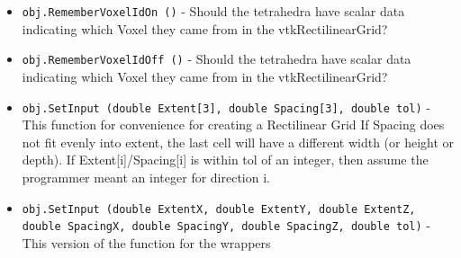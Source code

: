 \begin{itemize}
\item  \verb|obj.RememberVoxelIdOn ()| -  Should the tetrahedra have scalar data
 indicating which Voxel they came from in the vtkRectilinearGrid?

\item  \verb|obj.RememberVoxelIdOff ()| -  Should the tetrahedra have scalar data
 indicating which Voxel they came from in the vtkRectilinearGrid?

\item  \verb|obj.SetInput (double Extent[3], double Spacing[3], double tol)| -  This function for convenience for creating a Rectilinear Grid
 If Spacing does not fit evenly into extent, the last cell will
 have a different width (or height or depth).
 If Extent[i]/Spacing[i] is within tol of an integer, then
 assume the programmer meant an integer for direction i.

\item  \verb|obj.SetInput (double ExtentX, double ExtentY, double ExtentZ, double SpacingX, double SpacingY, double SpacingZ, double tol)| -  This version of the function for the wrappers

\end{itemize}
